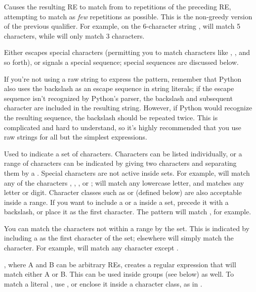 \begin{list}{}{\leftmargin \MyLeftMargin {} \MyLabelWidth}
\item[\code{\{\var{m},\var{n}\}?}] Causes the resulting RE to
match from  to  repetitions of the preceding RE,
attempting to match as \emph{few} repetitions as possible.  This is
the non-greedy version of the previous qualifier.  For example, on the
6-character string ,  will match 5
 characters, while  will only match 3
characters.

\item[\character{\e}] Either escapes special characters (permitting
you to match characters like \character{*}, , and so
forth), or signals a special sequence; special sequences are discussed
below.

If you're not using a raw string to
express the pattern, remember that Python also uses the
backslash as an escape sequence in string literals; if the escape
sequence isn't recognized by Python's parser, the backslash and
subsequent character are included in the resulting string.  However,
if Python would recognize the resulting sequence, the backslash should
be repeated twice.  This is complicated and hard to understand, so
it's highly recommended that you use raw strings for all but the
simplest expressions.

\item[\code{[]}] Used to indicate a set of characters.  Characters can
be listed individually, or a range of characters can be indicated by
giving two characters and separating them by a \character{-}.  Special
characters are not active inside sets.  For example, \regexp{[akm\$]}
will match any of the characters , ,
, or \character{\$}; \regexp{[a-z]}
will match any lowercase letter, and \code{[a-zA-Z0-9]} matches any
letter or digit.  Character classes such as  or  (defined below) are also acceptable inside a range.  If you want to
include a \character{]} or a \character{-} inside a set, precede it with a
backslash, or place it as the first character.  The 
pattern \regexp{[]]} will match \code{']'}, for example.  

You can match the characters not within a range by 
the set.  This is indicated by including a
\character{\^} as the first character of the set; \character{\^} elsewhere will
simply match the \character{\^} character.  For example, \regexp{[\^5]}
will match any character except .

\item[\character{|}], where A and B can be arbitrary REs,
creates a regular expression that will match either A or B.  This can
be used inside groups (see below) as well.  To match a literal \character{|},
use \regexp{\e|}, or enclose it inside a character class, as in  \regexp{[|]}.


\end{list}
